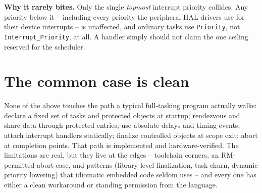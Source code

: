\textbf{Why it rarely bites.} Only the single \emph{topmost} interrupt priority
collides. Any priority below it -- including every priority the peripheral HAL
drivers use for their device interrupts -- is unaffected, and ordinary tasks use
\texttt{Priority}, not \texttt{Interrupt\_Priority}, at all. A handler simply
should not claim the one ceiling reserved for the scheduler.

\section{The common case is clean}

None of the above touches the path a typical full-tasking program actually walks:
declare a fixed set of tasks and protected objects at startup; rendezvous and
share data through protected entries; use absolute delays and timing events;
attach interrupt handlers statically; finalize controlled objects at scope exit;
abort at completion points. That path is implemented and hardware-verified. The
limitations are real, but they live at the edges -- toolchain corners, an
RM-permitted abort case, and patterns (library-level finalization, task churn,
dynamic priority lowering) that idiomatic embedded code seldom uses -- and every
one has either a clean workaround or standing permission from the language.
